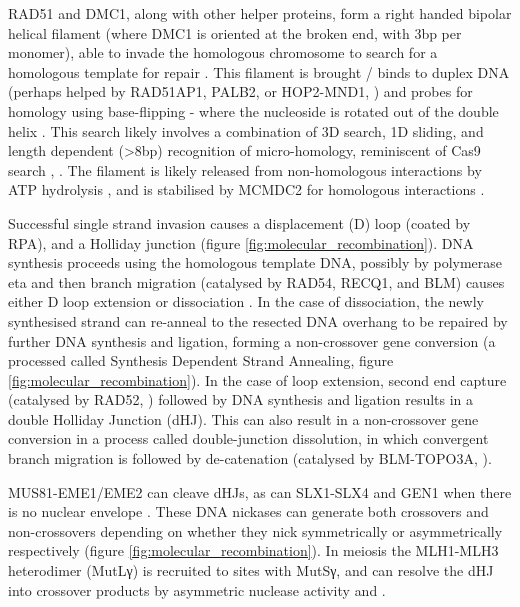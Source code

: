 RAD51 and DMC1, along with other helper proteins, form a right handed bipolar helical filament (where DMC1 is oriented at the broken end, with 3bp per monomer), able to invade the homologous chromosome to search for a homologous template for repair \parencite{Sehorn2004Human, Cloud2012Rad51, Brown2015Small, Brown2015DNA, Crickard2018Spontaneous}.
This filament is brought / binds to duplex DNA (perhaps helped by RAD51AP1, PALB2, or HOP2-MND1, \cite{Petukhova2005Hop2}) and probes for homology using base-flipping - where the nucleoside is rotated out of the double helix \parencite{Gupta1999Rapid, Folta-Stogniew2004Exchange}.
This search likely involves a combination of 3D search, 1D sliding, and length dependent (>8bp) recognition of micro-homology, reminiscent of Cas9 search \parencite{Ragunathan2012RecA,Forget2012Singlemolecule,Renkawitz2013Monitoring,Qi2015DNA,Lee2015Base}, \parencite[reviewed in][]{Barzel2008Finding, Renkawitz2014Mechanisms, Greene2016DNA, Kaniecki2018change, Haber2018DNA}.
The filament is likely released from non-homologous interactions by ATP hydrolysis \parencite{Lee2016ATP}, and is stabilised by MCMDC2 for homologous interactions \parencite{McNairn2017Repair}. 

Successful single strand invasion causes a displacement (D) loop (coated by RPA), and a Holliday junction (figure \ref{fig:molecular_recombination}).
DNA synthesis proceeds using the homologous template DNA, possibly by polymerase eta \parencite{McIlwraith2005Human, Kawamoto2005Dual} and then branch migration (catalysed by RAD54, RECQ1, and BLM) causes either D loop extension or dissociation \parencite{Bugreev2006Rad54,Bugreev2008RECQ1, Mazina2012Polarity}.
In the case of dissociation, the newly synthesised strand can re-anneal to the resected DNA overhang to be repaired by further DNA synthesis and ligation, forming a non-crossover gene conversion (a processed called Synthesis Dependent Strand Annealing, figure \ref{fig:molecular_recombination}).
In the case of loop extension, second end capture (catalysed by RAD52, \cite{Sugiyama1998DNA, Sugiyama2006Rad52mediated, McIlwraith2008DNA, Lao2008Rad52}) followed by DNA synthesis and ligation results in a double Holliday Junction (dHJ).
This can also result in a non-crossover gene conversion in a process called double-junction dissolution, in which convergent branch migration is followed by de-catenation (catalysed by BLM-TOPO3A, \cite{Wu2003Bloom, Bizard2014Dissolution}).

MUS81-EME1/EME2 can cleave dHJs, as can SLX1-SLX4 and GEN1 when there is no nuclear envelope \parencite[reviewed in][]{Wyatt2014Holliday}.
These DNA nickases can generate both crossovers and non-crossovers depending on whether they nick symmetrically or asymmetrically respectively (figure \ref{fig:molecular_recombination}).
In meiosis the MLH1-MLH3 heterodimer (MutLγ) is recruited to sites with MutSγ, and can resolve the dHJ into crossover products by asymmetric nuclease activity \parencite{Zakharyevich2012Delineation} and \parencite[reviewed in][]{Hunter2015Meiotic, Gray2016Control, Manhart2016Roles, Toledo2019mutation}. 

